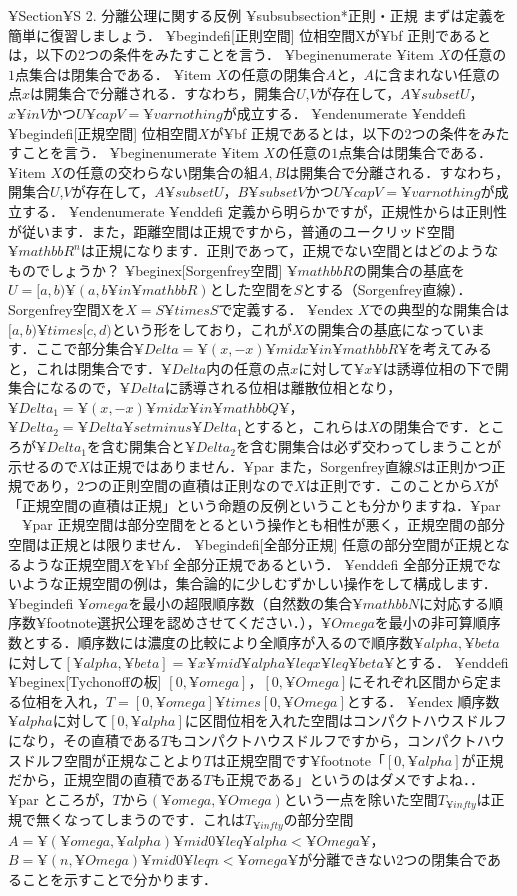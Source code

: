 ¥Section{¥S 2. 分離公理に関する反例}
¥subsubsection*{正則・正規}
まずは定義を簡単に復習しましょう．
¥begin{defi}[正則空間]
位相空間Xが{¥bf 正則}であるとは，以下の2つの条件をみたすことを言う．
¥begin{enumerate}
¥item $X$の任意の$1$点集合は閉集合である．
¥item $X$の任意の閉集合$A$と，$A$に含まれない任意の点$x$は開集合で分離される．すなわち，開集合$U$,$V$が存在して，$A¥subset U$，$x¥in V$かつ$U¥cap V=¥varnothing$が成立する．
¥end{enumerate}
¥end{defi}
¥begin{defi}[正規空間]
位相空間$X$が{¥bf 正規}であるとは，以下の2つの条件をみたすことを言う．
¥begin{enumerate}
¥item $X$の任意の$1$点集合は閉集合である．
¥item $X$の任意の交わらない閉集合の組$A,B$は開集合で分離される．すなわち，開集合$U$,$V$が存在して，$A¥subset U$，$B¥subset V$かつ$U¥cap V=¥varnothing$が成立する．
¥end{enumerate}
¥end{defi}
定義から明らかですが，正規性からは正則性が従います．また，距離空間は正規ですから，普通のユークリッド空間$¥mathbb{R}^n$は正規になります．正則であって，正規でない空間とはどのようなものでしょうか？
¥begin{ex}[Sorgenfrey空間]
$¥mathbb{R}$の開集合の基底を$U=[a,b)¥ (a,b¥in¥mathbb{R})$とした空間を$S$とする（Sorgenfrey直線）．Sorgenfrey空間Xを$X=S¥times S$で定義する．
¥end{ex}
$X$での典型的な開集合は$[a,b)¥times[c,d)$という形をしており，これが$X$の開集合の基底になっています．ここで部分集合$¥Delta=¥{(x,-x)¥mid x¥in¥mathbb{R}¥}$を考えてみると，これは閉集合です．$¥Delta$内の任意の点$x$に対して$¥{ x ¥}$は誘導位相の下で開集合になるので，$¥Delta$に誘導される位相は離散位相となり，$¥Delta_1=¥{(x,-x)¥mid x¥in¥mathbb{Q}¥}$，$¥Delta_2=¥Delta¥setminus¥Delta_1$とすると，これらは$X$の閉集合です．ところが$¥Delta_1$を含む開集合と$¥Delta_2$を含む開集合は必ず交わってしまうことが示せるので$X$は正規ではありません．¥par
また，Sorgenfrey直線$S$は正則かつ正規であり，$2$つの正則空間の直積は正則なので$X$は正則です．このことから$X$が「正規空間の直積は正規」という命題の反例ということも分かりますね．¥par
　¥par
正規空間は部分空間をとるという操作とも相性が悪く，正規空間の部分空間は正規とは限りません．
¥begin{defi}[全部分正規]
任意の部分空間が正規となるような正規空間$X$を{¥bf 全部分正規}であるという．
¥end{defi}
全部分正規でないような正規空間の例は，集合論的に少しむずかしい操作をして構成します．
¥begin{defi}
$¥omega$を最小の超限順序数（自然数の集合$¥mathbb{N}$に対応する順序数¥footnote{選択公理を認めさせてください．}），$¥Omega$を最小の非可算順序数とする．順序数には濃度の比較により全順序が入るので順序数$¥alpha,¥beta$に対して$[¥alpha,¥beta]=¥{x¥mid ¥alpha¥leq x¥leq ¥beta¥}$とする．
¥end{defi}
¥begin{ex}[Tychonoffの板]
$[0,¥omega]$，$[0,¥Omega]$にそれぞれ区間から定まる位相を入れ，$T=[0,¥omega]¥times[0,¥Omega]$とする．
¥end{ex}
順序数$¥alpha$に対して$[0,¥alpha]$に区間位相を入れた空間はコンパクトハウスドルフになり，その直積である$T$もコンパクトハウスドルフですから，コンパクトハウスドルフ空間が正規なことより$T$は正規空間です¥footnote{「$[0,¥alpha]$が正規だから，正規空間の直積である$T$も正規である」というのはダメですよね．}．¥par
ところが，$T$から$(¥omega,¥Omega)$という一点を除いた空間$T_{¥infty}$は正規で無くなってしまうのです．これは$T_{¥infty}$の部分空間$A=¥{(¥omega,¥alpha)¥mid 0¥leq ¥alpha<¥Omega¥}$，$B=¥{ (n,¥Omega)¥mid 0¥leq n<¥omega ¥}$が分離できない$2$つの閉集合であることを示すことで分かります．

